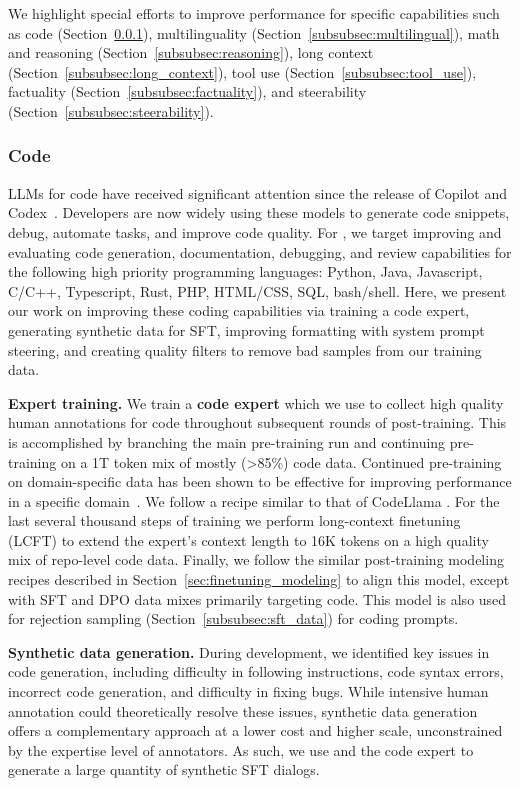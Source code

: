 \documentclass[dvipsnames]{fairmeta}
\begin{document}
We highlight special efforts to improve performance for specific capabilities such as code (Section~\ref{subsubsec:code}), multilinguality (Section~\ref{subsubsec:multilingual}), math and reasoning (Section~\ref{subsubsec:reasoning}), long context (Section~\ref{subsubsec:long_context}), tool use (Section~\ref{subsubsec:tool_use}), factuality (Section~\ref{subsubsec:factuality}), and steerability (Section~\ref{subsubsec:steerability}).  

\subsubsection{Code}
\label{subsubsec:code}

LLMs for code have received significant attention since the release of Copilot and Codex~\citep{chen2021evaluating}. 
Developers are now widely using these models to generate code snippets, debug, automate tasks, and improve code quality.
For \llamathree, we target improving and evaluating code generation, documentation, debugging, and review capabilities for the following high priority programming languages: Python, Java, Javascript, C/C++, Typescript, Rust, PHP, HTML/CSS, SQL, bash/shell. 
Here, we present our work on improving these coding capabilities via training a code expert, generating synthetic data for SFT, improving formatting with system prompt steering, and creating quality filters to remove bad samples from our training data.

\textbf{Expert training.} We train a \textbf{code expert} which we use to collect high quality human annotations for code throughout subsequent rounds of post-training. This is accomplished by branching the main pre-training run and continuing pre-training on a 1T token mix of mostly (>85\%) code data. Continued pre-training on domain-specific data has been shown to be effective for improving performance in a specific domain~\citep{gururangan2024dontstoppretraining}. We follow a recipe similar to that of CodeLlama \citep{codellama}. For the last several thousand steps of training we perform {long-context finetuning} (LCFT) to extend the expert's context length to 16K tokens on a high quality mix of repo-level code data. Finally, we follow the similar post-training modeling recipes described in Section~\ref{sec:finetuning_modeling} to align this model, except with SFT and DPO data mixes primarily targeting code.  This model is also used for rejection sampling (Section~\ref{subsubsec:sft_data}) for coding prompts.

\textbf{Synthetic data generation.}
During development, we identified key issues in code generation, including difficulty in following instructions, code syntax errors, incorrect code generation, and difficulty in fixing bugs. While intensive human annotation could theoretically resolve these issues, synthetic data generation offers a complementary approach at a lower cost and higher scale, unconstrained by the expertise level of annotators. As such, we use \llamathree and the code expert to generate a large quantity of synthetic SFT dialogs. 
\end{document}
